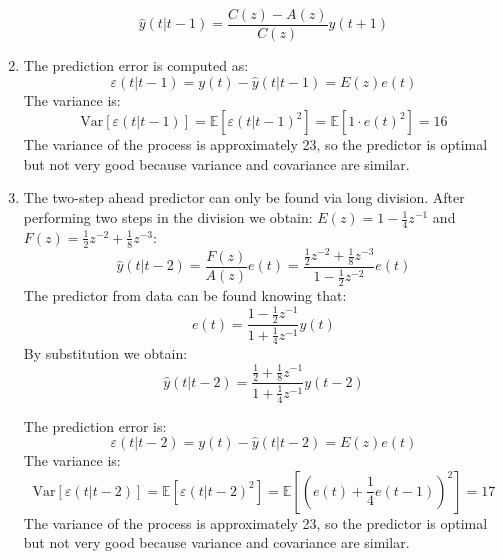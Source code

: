 \begin{enumerate}
        \[\hat{y}(t|t-1)=\dfrac{C(z)-A(z)}{C(z)}y(t+1)\]
    \item The prediction error is computed as: 
        \[\varepsilon(t|t-1)=y(t)-\hat{y}(t|t-1)=E(z)e(t)\]
        The variance is: 
        \[\text{Var}\left[\varepsilon(t|t-1)\right]=\mathbb{E}\left[\varepsilon(t|t-1)^2\right]=\mathbb{E}\left[1 \cdot e(t)^2\right]=16\]
        The variance of the process is approximately 23, so the predictor is optimal but not very good because variance and covariance are similar.  
    \item The two-step ahead predictor can only be found via long division. 
        After performing two steps in the division we obtain: $E(z)=1-\frac{1}{4}z^{-1}$ and $F(z)=\frac{1}{2}z^{-2}+\frac{1}{8}z^{-3}$: 
        \[\hat{y}(t|t-2)=\dfrac{F(z)}{A(z)}e(t)=\dfrac{\frac{1}{2}z^{-2}+\frac{1}{8}z^{-3}}{1-\frac{1}{2}z^{-2}}e(t)\]
        The predictor from data can be found knowing that: 
        \[e(t)=\dfrac{1-\frac{1}{2}z^{-1}}{1+\frac{1}{4}z^{-1}}y(t)\]
        By substitution we obtain: 
        \[\hat{y}(t|t-2)=\dfrac{\frac{1}{2}+\frac{1}{8}z^{-1}}{1+\frac{1}{4}z^{-1}}y(t-2)\]
        
        The prediction error is: 
        \[\varepsilon(t|t-2)=y(t)-\hat{y}(t|t-2)=E(z)e(t)\]
        The variance is: 
        \[\text{Var}\left[\varepsilon(t|t-2)\right]=\mathbb{E}\left[\varepsilon(t|t-2)^2\right]=\mathbb{E}\left[\left( e(t) +\frac{1}{4}e(t-1) \right)^2\right]=17\]
        The variance of the process is approximately 23, so the predictor is optimal but not very good because variance and covariance are similar.  
\end{enumerate}